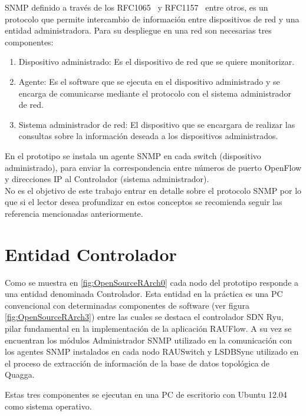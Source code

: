 SNMP definido a través de los RFC1065~\citep{rose1990structure} y RFC1157~\citep{case1989simple} entre otros, es un protocolo que permite intercambio de información entre dispositivos de red y una entidad administradora. Para su despliegue en una red son necesarias tres componentes: 

\begin{enumerate}

\item Dispositivo administrado: Es el dispositivo de red que se quiere monitorizar.

\item Agente: Es el software que se ejecuta en el dispositivo administrado y se encarga de comunicarse mediante el protocolo con el sistema administrador de red.

\item Sistema administrador de red: El dispositivo que se encargara de realizar las consultas sobre la información deseada a los dispositivos administrados.

\end{enumerate}	

En el prototipo se instala un agente SNMP en cada switch (dispositivo administrado), para enviar la correspondencia entre números de puerto OpenFlow y direcciones IP al Controlador (sistema administrador).\\

No es el objetivo de este trabajo entrar en detalle sobre el protocolo SNMP por lo que si el lector desea profundizar en estos conceptos se recomienda seguir las referencia mencionadas anteriormente.

\section{Entidad Controlador}
Como se muestra en \ref{fig:OpenSourceRArch0} cada nodo del prototipo responde a una entidad denominada Controlador. Esta entidad en la pr\'actica es una PC convencional con determinadas componentes de software (ver figura \ref{fig:OpenSourceRArch3}) entre las cuales se destaca el controlador SDN Ryu, pilar fundamental en la implementaci\'on de la aplicaci\'on RAUFlow. A su vez se encuentran los módulos Administrador SNMP utilizado en la comunicaci\'on con los agentes SNMP instalados en cada nodo RAUSwitch y LSDBSync utilizado en el proceso de extracci\'on de informaci\'on de la base de datos topol\'ogica de Quagga. 

Estas tres componentes se ejecutan en una PC de escritorio con Ubuntu 12.04 como sistema operativo. \\

